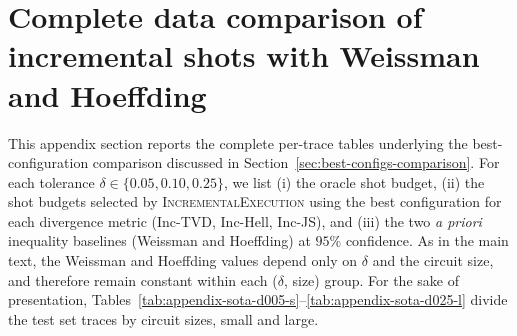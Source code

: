 \section{Complete data comparison of incremental shots with Weissman and Hoeffding}
\label{app:full-sample-complexity}

This appendix section reports the complete per-trace tables underlying the best-configuration comparison discussed in Section~\ref{sec:best-configs-comparison}. For each tolerance $\delta\in\{0.05,0.10,0.25\}$, we list (i) the oracle shot budget, (ii) the shot budgets selected by \textsc{IncrementalExecution} using the best configuration for each divergence metric (Inc-TVD, Inc-Hell, Inc-JS), and (iii) the two \emph{a priori} inequality baselines (Weissman and Hoeffding) at $95\%$ confidence. As in the main text, the Weissman and Hoeffding values depend only on $\delta$ and the circuit size, and therefore remain constant within each ($\delta$, size) group. For the sake of presentation, Tables~\ref{tab:appendix-sota-d005-s}--\ref{tab:appendix-sota-d025-l} divide the test set traces by circuit sizes, small and large.


